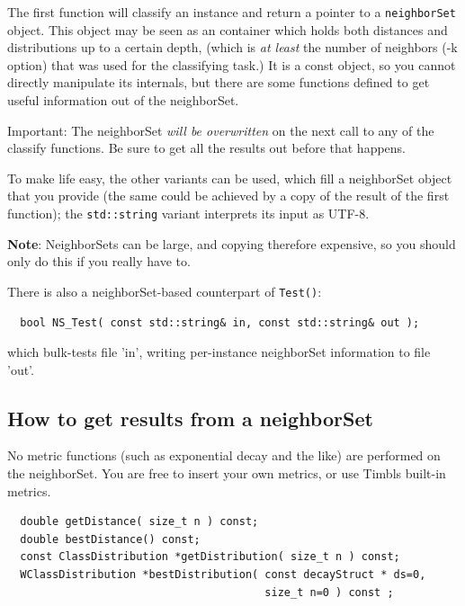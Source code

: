 \documentclass{report}
\begin{document}
The first function will classify an instance and return a pointer to a
{\tt neighborSet} object. This object may be seen as an container
which holds both distances and distributions up to a certain depth,
(which is {\em at least}\/ the number of neighbors (-k option) that
was used for the classifying task.)  It is a const object, so you
cannot directly manipulate its internals, but there are some
functions defined to get useful information out of the neighborSet.

Important:  The neighborSet {\em will be overwritten}\/ on the next
call to any of the classify functions. Be sure to get all the
results out before that happens.

To make life easy, the other variants can be used, which fill a
neighborSet object that you provide (the same could be achieved by a
copy of the result of the first function); the {\tt std::string}
variant interprets its input as UTF-8.

{\bf Note}: NeighborSets can be large, and copying therefore
expensive, so you should only do this if you really have to.

There is also a neighborSet-based counterpart of {\tt Test()}:

\begin{footnotesize}
\begin{verbatim}
  bool NS_Test( const std::string& in, const std::string& out );
\end{verbatim}
\end{footnotesize}

which bulk-tests file 'in', writing per-instance neighborSet
information to file 'out'.

\subsection{How to get results from a neighborSet}

No metric functions (such as exponential decay and the like) are
performed on the neighborSet. You are free to insert your own metrics, or
use Timbls built-in metrics.

\begin{footnotesize}
\begin{verbatim}
  double getDistance( size_t n ) const;
  double bestDistance() const;
  const ClassDistribution *getDistribution( size_t n ) const;
  WClassDistribution *bestDistribution( const decayStruct * ds=0,
                                        size_t n=0 ) const ;
\end{verbatim}
\end{footnotesize}
\end{document}
